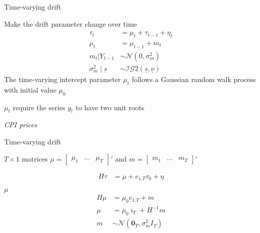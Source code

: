 \documentclass[notes,blackandwhite,mathsans,usenames,dvipsnames]{beamer}
\begin{document}
\begin{frame}{Time-varying drift}

{\color{mcxs2}Make the drift parameter change over time} 
\begin{align*}
\tau_t &= \mu_t + \tau_{t-1} + \eta_t\\
\mu_t &= \mu_{t-1} + m_t\\[1ex]
m_t|Y_{t-1} &\sim \mathcal{N}\left(0,\sigma_m^2\right)\\
\sigma_m^2 \mid \underline{s} &\sim\mathcal{IG}2(\underline{s},\underline{\nu})
\end{align*}
{\color{mcxs2}The time-varying intercept parameter} $\mu_t$ {\color{mcxs2}follows a Gaussian random walk process with initial value} $\mu_0$

 $\mu_t$ {\color{mcxs2}require the series} $y_t$ {\color{mcxs2}to have two unit roots}

 \emph{CPI prices}
\end{frame}





\begin{frame}{Time-varying drift}

 $T\times1$ {\color{mcxs2}matrices} $\mu=\begin{bmatrix} \mu_1&\hdots&  \mu_T\end{bmatrix}'$ {\color{mcxs2}and} $m=\begin{bmatrix}m_1& \hdots & m_T\end{bmatrix}'$

\begin{align*}
H\tau &= \mu + e_{1.T}\tau_0 + \eta 
\end{align*}

 $\mu$
\begin{align*}
H\mu &= \mu_0e_{1.T} + m\\
\mu &= \mu_0\imath_{T} + H^{-1}m\\[1ex]
m &\sim \mathcal{N}\left(\mathbf{0}_T, \sigma^2_m I_T\right)
\end{align*}

\end{frame}
\end{document}

